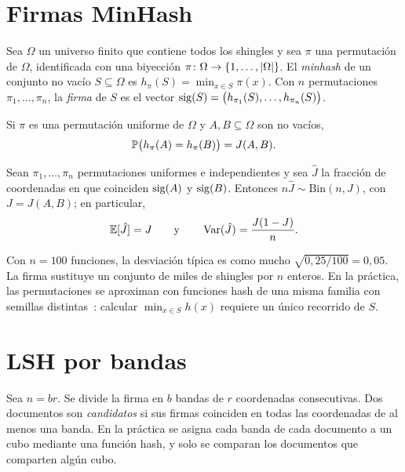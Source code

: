 \section{Firmas MinHash}

\begin{definicion}[MinHash]
Sea $\Omega$ un universo finito que contiene todos los shingles y sea $\pi$ una permutación de $\Omega$, identificada con una biyección $\pi\colon\Omega\to\{1,\dots,\lvert\Omega\rvert\}$. El \emph{minhash} de un conjunto no vacío $S\subseteq\Omega$ es $h_\pi(S)=\min_{x\in S}\pi(x)$. Con $n$ permutaciones $\pi_1,\dots,\pi_n$, la \emph{firma} de $S$ es el vector $\operatorname{sig}(S)=\bigl(h_{\pi_1}(S),\dots,h_{\pi_n}(S)\bigr)$.
\end{definicion}

\begin{teorema}\label{teo:minhash}
Si $\pi$ es una permutación uniforme de $\Omega$ y $A,B\subseteq\Omega$ son no vacíos,
\[
\mathbb{P}\bigl(h_\pi(A)=h_\pi(B)\bigr)=J(A,B).
\]
\end{teorema}

\begin{corolario}\label{cor:estimador}
Sean $\pi_1,\dots,\pi_n$ permutaciones uniformes e independientes y sea $\hat J$ la fracción de coordenadas en que coinciden $\operatorname{sig}(A)$ y $\operatorname{sig}(B)$. Entonces $n\hat J\sim\mathrm{Bin}(n,J)$, con $J=J(A,B)$; en particular,
\[
\mathbb{E}[\hat J]=J\qquad\text{y}\qquad\operatorname{Var}(\hat J)=\frac{J(1-J)}{n}.
\]
\end{corolario}

Con $n=100$ funciones, la desviación típica es como mucho $\sqrt{0{,}25/100}=0{,}05$. La firma sustituye un conjunto de miles de shingles por $n$ enteros. En la práctica, las permutaciones se aproximan con funciones hash de una misma familia con semillas distintas~\cite[§3.2]{cs336a4}: calcular $\min_{x\in S}h(x)$ requiere un único recorrido de $S$.

\section{LSH por bandas}

\begin{definicion}
Sea $n=br$. Se divide la firma en $b$ bandas de $r$ coordenadas consecutivas. Dos documentos son \emph{candidatos} si sus firmas coinciden en todas las coordenadas de al menos una banda. En la práctica se asigna cada banda de cada documento a un cubo mediante una función hash, y solo se comparan los documentos que comparten algún cubo.
\end{definicion}


